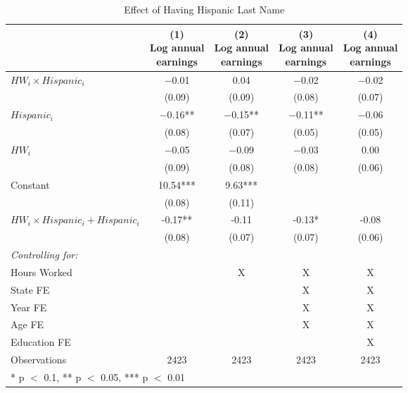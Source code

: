\begin{table}[H]

\caption{Effect of Having Hispanic Last Name \label{tab:identreg}}
\centering
\begin{threeparttable}
\begin{tabular}[t]{lcccc}
\toprule
  & \specialcell{(1) \\ Log annual \\ earnings} & \specialcell{(2) \\ Log annual \\ earnings} & \specialcell{(3) \\ Log annual \\ earnings} & \specialcell{(4) \\  Log annual \\ earnings}\\
\midrule
$HW_{i} \times Hispanic_{i}$ & \num{-0.01} & \num{0.04} & \num{-0.02} & \num{-0.02}\\
 & (\num{0.09}) & (\num{0.09}) & (\num{0.08}) & (\num{0.07})\\
$Hispanic_{i}$ & \num{-0.16}** & \num{-0.15}** & \num{-0.11}** & \num{-0.06}\\
 & (\num{0.08}) & (\num{0.07}) & (\num{0.05}) & (\num{0.05})\\
$HW_{i}$ & \num{-0.05} & \num{-0.09} & \num{-0.03} & \num{0.00}\\
 & (\num{0.09}) & (\num{0.08}) & (\num{0.08}) & (\num{0.06})\\
Constant & \num{10.54}*** & \num{9.63}*** &  & \\
 & (\num{0.08}) & (\num{0.11}) &  & \\
\midrule
$HW_{i} \times Hispanic_{i} + Hispanic_{i}$ & -0.17** & -0.11 & -0.13* & -0.08\\
 & (0.08) & (0.07) & (0.07) & (0.06)\\
\midrule
\textit{Controlling for:} &  &  &  & \\
Hours Worked &  & X & X & X\\
State FE &  &  & X & X\\
Year FE &  &  & X & X\\
Age FE &  &  & X & X\\
Education FE &  &  &  & X\\
Observations & \num{2423} & \num{2423} & \num{2423} & \num{2423}\\
\bottomrule
\multicolumn{5}{l}{\rule{0pt}{1em}* p $<$ 0.1, ** p $<$ 0.05, *** p $<$ 0.01}\\
\end{tabular}

\end{threeparttable}
\end{table}
